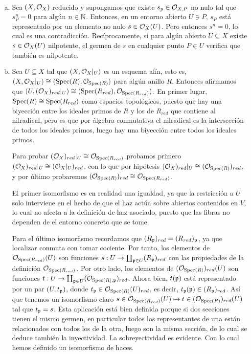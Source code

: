 \documentclass[twoside]{article}
\begin{document}
\begin{solucion}\
\begin{enumerate}[(a)]
\item Sea $(X,{\mathcal O}_X)$ reducido y supongamos que existe $s_p\in {\mathcal O}_{X,P}$ no nulo tal que $s^n_P=0$ para algún $n\in\mathbb{N}$. Entonces, en un entorno abierto $U\ni P$, $s_P$ está representado por un elemento no nulo $s\in{\mathcal O}_X(U)$. Pero entonces $s^n=0$, lo cual es una contradicción. Recíprocamente, si para algún abierto $U\subseteq X$ existe $s\in {\mathcal O}_X(U)$ nilpotente, el germen de $s$ en cualquier punto $P\in U$ verifica que también es nilpotente. 

\item Sea $U\subseteq X$ tal que $(X,{\mathcal O}_X|_{U})$ es un esquema afín, esto es, $(X,{\mathcal O}_X|_{U})\cong (\operatorname{Spec}(R),{\mathcal O}_{\operatorname{Spec}(R)})$ para algún anillo $R$. Entonces afirmamos que $(U, ({\mathcal O}_X)_{red}|_{U})\cong (\operatorname{Spec}(R_{red}), {\mathcal O}_{\operatorname{Spec}(R_{red})})$. En primer lugar, $\operatorname{Spec}(R)\cong\operatorname{Spec}(R_{red})$ como espacios topológicos, puesto que hay una biyección entre los ideales primos de $R$ y los de $R_{red}$ que contiene al nilradical, pero es que por álgebra conmutativa el nilradical es la intersección de todos los ideales primos, luego hay una biyección entre todos los ideales primos. 

Para probar $({\mathcal O}_X)_{red}|_{U}\cong {\mathcal O}_{\operatorname{Spec}(R_{red})}$ probamos primero  $({\mathcal O}_X)_{red}|_{U}\cong({\mathcal O}_X|_{U})_{red}$, con lo que por hipótesis $({\mathcal O}_X)_{red}|_{U}\cong ({\mathcal O}_{\operatorname{Spec}(R)})_{red}$, y por último probaremos $({\mathcal O}_{\operatorname{Spec}(R)})_{red}\cong {\mathcal O}_{\operatorname{Spec}(R_{red})}$. 

El primer isomorfismo es en realidad una igualdad, ya que la restricción a $U$ solo interviene en el hecho de que el haz actúa sobre abiertos contenidos en $V$, lo cual no afecta a la definición de haz asociado, puesto que las fibras no dependen de el entorno concreto que se tome. 

Para el último isomorfismo recordamos que $(R_{\mathfrak{p}})_{red}=(R_{red})_{\mathfrak{p}}$, ya que localizar conmuta con tomar cociente. Por tanto, los elementos de ${\mathcal O}_{\operatorname{Spec}(R_{red})}(U)$ son funciones $s:U\to\coprod_{\mathfrak{p}\in U}(R_{\mathfrak{p}})_{red}$ con las propiedades de la definición ${\mathcal O}_{\operatorname{Spec}(R_{red})}$. Por otro lado, los elementos de $({\mathcal O}_{\operatorname{Spec}(R)})_{red}(U)$ son funciones $t:U\to \coprod_{\mathfrak{p}\in U}({\mathcal O}_{\operatorname{Spec}(R),\mathfrak{p}})_{red}$. Ahora bien, $t(\mathfrak{p})$ está representado por un par $(U, t_{\mathfrak{p}})$, donde $t_{\mathfrak{p}}\in {\mathcal O}_{\operatorname{Spec}(R)}(U)_{red}$, es decir, $t_{\mathfrak{p}}(\mathfrak{p})\in (R_{\mathfrak{p}})_{red}$. Así que tenemos un isomorfismo claro $s\in {\mathcal O}_{\operatorname{Spec}(R_{red})}(U)\mapsto t\in ({\mathcal O}_{\operatorname{Spec}(R)})_{red}(U)$ tal que $t_{\mathfrak{p}}=s$. Esta aplicación está bien definida porque si dos secciones tienen el mismo germen, en particular todos los representantes de una están relacionados con todos los de la otra, luego son la misma sección, de lo cual se deduce también la inyectividad. La sobreyectividad es evidente. Con lo cual hemos definido un isomorfismo de haces. 


\end{enumerate}
\end{solucion}
\end{document}
